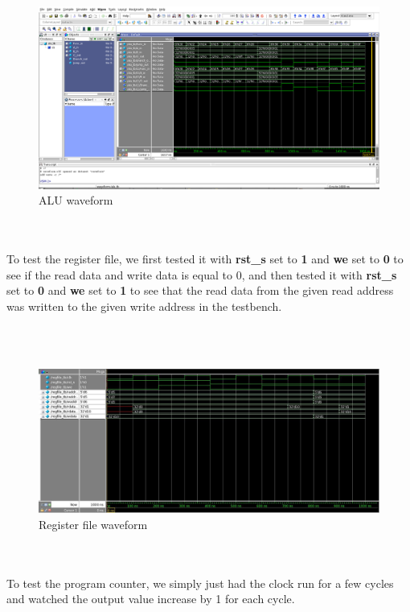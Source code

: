 \documentclass{article}
\begin{document}
\\ \\
\begin{figure}[!ht]
	\centering
		\includegraphics[width=1\textwidth]{ALU_waveform.png}
		\caption{ALU waveform}
\end{figure}
\\ \\

To test the register file, we first tested it with \textbf{rst\_s} set to \textbf{1}  and \textbf{we} set to \textbf{0} to see if the read data and write data is equal to 0, and then tested it with \textbf{rst\_s} set to \textbf{0}  and \textbf{we} set to \textbf{1} to see that the read data from the given read address was written to the given write address in the testbench.

\\ \\
\begin{figure}[!ht]
	\centering
		\includegraphics[width=1\textwidth]{regfile_waveform.jpg}
		\caption{Register file waveform}
\end{figure}
\\ \\

To test the program counter, we simply just had the clock run for a few cycles and watched the output value increase by 1 for each cycle.
\end{document}
